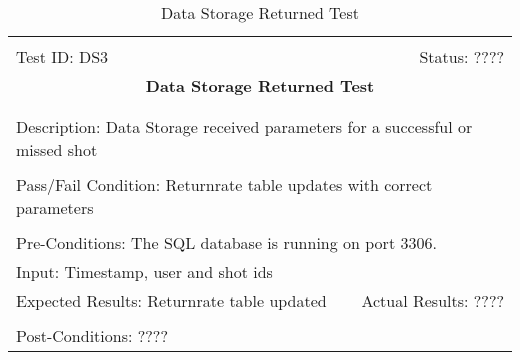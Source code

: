 \documentclass[11pt]{article}
\begin{document}
\begin{center}
\begin{table}[H]
\begin{tabular}{|l r|}\hline&\\[-2mm]
	Test ID: DS3	&Status: ????\\[-3mm]
	\multicolumn{2}{|c|}{\textbf{\large{Data Storage Returned Test}}}\\&\\\hline&\\[-3mm]
	\multicolumn{2}{|p{\textwidth}|}{Description: Data Storage received parameters for a successful or missed shot}\\[1mm]\hline&\\[-3mm]
	\multicolumn{2}{|p{\textwidth}|}{Pass/Fail Condition: Returnrate table updates with correct parameters}\\[1mm]\hline&\\[-3mm]
	\multicolumn{2}{|p{\textwidth}|}{Pre-Conditions: The SQL database is running on port 3306.}\\[4mm]
	\multicolumn{2}{|p{\textwidth}|}{Input: Timestamp, user and shot ids}\\[2mm]\hline
	\multicolumn{1}{|p{0.49\textwidth}}{Expected Results: Returnrate table updated}	&\multicolumn{1}{|p{0.45\textwidth}|}{Actual Results: ????}\\\hline&\\[-3mm]
	\multicolumn{2}{|p{\textwidth}|}{Post-Conditions: ????}\\\hline
\end{tabular}
\caption{Data Storage Returned Test}
\end{table}
\end{center}
\end{document}
